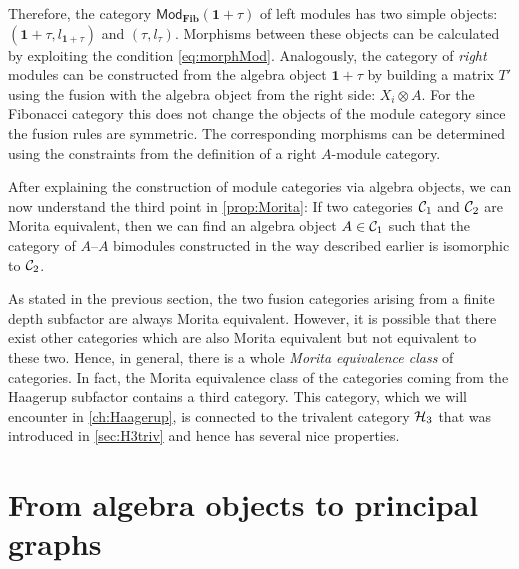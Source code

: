 \begin{exmp}
	Therefore, the category $\mathsf{Mod}_{\mathbf{Fib}}(\mathbf{1}+\tau)$ of left modules has two simple objects: $(\mathbf{1}+\tau,l_{\mathbf{1}+\tau})$ and $(\tau,l_\tau)$. Morphisms between these objects can be calculated by exploiting the condition \cref{eq:morphMod}. Analogously, the category of \emph{right} modules can be constructed from the algebra object $\mathbf{1}+\tau$ by building a matrix $T'$ using the fusion with the algebra object from the right side: $X_i\otimes A$. For the Fibonacci category this does not change the objects of the module category since the fusion rules are symmetric. The corresponding morphisms can be determined using the constraints from the definition of a right $A$-module category.
\end{exmp}

After explaining the construction of module categories via algebra objects, we can now understand the third point in \cref{prop:Morita}: If two categories ${\mathcal{C}}_1$ and ${\mathcal{C}}_2$ are Morita equivalent, then we can find an algebra object $A\in{\mathcal{C}}_1$ such that the category of $A$--$A$ bimodules constructed in the way described earlier is isomorphic to ${\mathcal{C}}_2$. 

As stated in the previous section, the two fusion categories arising from a finite depth subfactor are always Morita equivalent. However, it is possible that there exist other categories which are also Morita equivalent but not equivalent to these two. Hence, in general, there is a whole \emph{Morita equivalence class} of categories. In fact, the Morita equivalence class of the categories coming from the Haagerup subfactor contains a third category. This category, which we will encounter in \cref{ch:Haagerup}, is connected to the trivalent category ${\mathcal{H}_3}$ that was introduced in \cref{sec:H3triv} and hence has several nice properties. 


\section{From algebra objects to principal graphs}
\label{sec:AOtographs}

